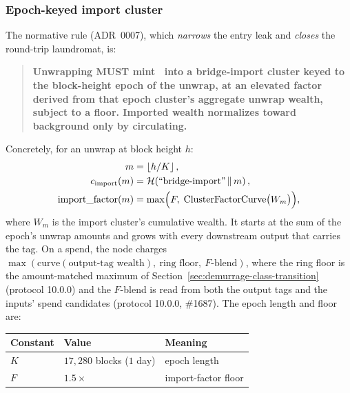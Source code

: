 \subsubsection{Epoch-keyed import cluster}

The normative rule (ADR~0007), which \emph{narrows} the entry leak and
\emph{closes} the round-trip laundromat, is:

\begin{quote}
\textbf{Unwrapping MUST mint \BTH\ into a bridge-import cluster keyed to the
block-height epoch of the unwrap, at an elevated factor derived from that epoch
cluster's aggregate unwrap wealth, subject to a floor. Imported wealth
normalizes toward background only by circulating.}
\end{quote}

Concretely, for an unwrap at block height $h$:
\begin{align}
m &= \left\lfloor h / K \right\rfloor, \label{eq:bridge:epoch}\\
c_{\mathrm{import}}(m) &= \mathcal{H}\!\left(\text{``bridge-import''} \,\|\, m\right), \label{eq:bridge:cluster}\\
\mathrm{import\_factor}(m) &= \max\!\Big(F,\; \mathrm{ClusterFactorCurve}\big(W_m\big)\Big), \label{eq:bridge:importfactor}
\end{align}
where $W_m$ is the import cluster's cumulative wealth. It starts at the sum of the
epoch's unwrap amounts and grows with every downstream output that carries the
tag. On a spend, the node charges
$\max(\mathrm{curve}(\text{output-tag wealth}),\ \text{ring floor},\ F\text{-blend})$,
where the ring floor is the amount-matched maximum of Section~\ref{sec:demurrage-class-transition}
(protocol 10.0.0) and the $F$-blend is read from both the output tags and the
inputs' spend candidates (protocol 10.0.0, \#1687).
The epoch length and floor are:
\begin{center}
\begin{tabular}{lll}
\toprule
\textbf{Constant} & \textbf{Value} & \textbf{Meaning} \\
\midrule
$K$ & $17{,}280$ blocks ($1$ day) & epoch length \\ %
$F$ & $1.5\times$ & import-factor floor \\ %
\bottomrule
\end{tabular}
\end{center}

